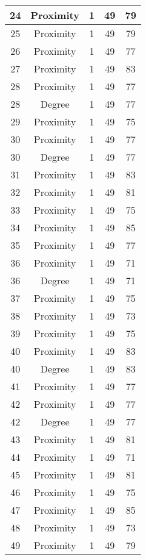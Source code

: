 \documentclass[results.tex]{subfiles}
\begin{document}
\begin{center}
\begin{tabular}{| c || c | c | c | c |}
    \hline
    24 & Proximity & 1 & 49 & 79 \\ 
    \hline
    25 & Proximity & 1 & 49 & 79 \\ 
    \hline
    26 & Proximity & 1 & 49 & 77 \\ 
    \hline
    27 & Proximity & 1 & 49 & 83 \\ 
    \hline
    28 & Proximity & 1 & 49 & 77 \\ 
    \hline
    28 & Degree & 1 & 49 & 77 \\ 
    \hline
    29 & Proximity & 1 & 49 & 75 \\ 
    \hline
    30 & Proximity & 1 & 49 & 77 \\ 
    \hline
    30 & Degree & 1 & 49 & 77 \\ 
    \hline
    31 & Proximity & 1 & 49 & 83 \\ 
    \hline
    32 & Proximity & 1 & 49 & 81 \\ 
    \hline
    33 & Proximity & 1 & 49 & 75 \\ 
    \hline
    34 & Proximity & 1 & 49 & 85 \\ 
    \hline
    35 & Proximity & 1 & 49 & 77 \\ 
    \hline
    36 & Proximity & 1 & 49 & 71 \\ 
    \hline
    36 & Degree & 1 & 49 & 71 \\ 
    \hline
    37 & Proximity & 1 & 49 & 75 \\ 
    \hline
    38 & Proximity & 1 & 49 & 73 \\ 
    \hline
    39 & Proximity & 1 & 49 & 75 \\ 
    \hline
    40 & Proximity & 1 & 49 & 83 \\ 
    \hline
    40 & Degree & 1 & 49 & 83 \\ 
    \hline
    41 & Proximity & 1 & 49 & 77 \\ 
    \hline
    42 & Proximity & 1 & 49 & 77 \\ 
    \hline
    42 & Degree & 1 & 49 & 77 \\ 
    \hline
    43 & Proximity & 1 & 49 & 81 \\ 
    \hline
    44 & Proximity & 1 & 49 & 71 \\ 
    \hline
    45 & Proximity & 1 & 49 & 81 \\ 
    \hline
    46 & Proximity & 1 & 49 & 75 \\ 
    \hline
    47 & Proximity & 1 & 49 & 85 \\ 
    \hline
    48 & Proximity & 1 & 49 & 73 \\ 
    \hline
    49 & Proximity & 1 & 49 & 79 \\ 
    \hline   \end{tabular}
\end{center}
\end{document}

